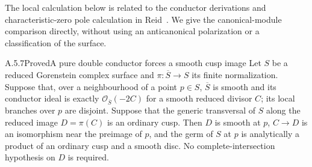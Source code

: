 The local calculation below is related to the conductor
derivations and characteristic-zero pole calculation in
Reid~\cite[\S3.9, \S4.4--4.8]{Reid1994Nonnormal}.
We give the canonical-module comparison directly, without
using an anticanonical polarization or a classification of
the surface.

\begin{statement}{A.5.7}{Proved}{A pure double conductor forces a smooth cusp image}
Let $S$ be a reduced Gorenstein complex surface and
$\pi:\overline S\to S$ its finite normalization.
Suppose that, over a neighbourhood of a point $p\in S$,
$\overline S$ is smooth and its conductor ideal is exactly
$\mathcal O_{\overline S}(-2C)$ for a smooth reduced
divisor $C$; its local branches over $p$ are disjoint.
Suppose that the generic transversal of $S$ along the
reduced image $D=\pi(C)$ is an ordinary cusp.
Then $D$ is smooth at $p$, $C\to D$ is an isomorphism
near the preimage of $p$, and the germ of $S$ at $p$ is
analytically a product of an ordinary cusp and a smooth disc.
No complete-intersection hypothesis on $D$ is required.
\end{statement}

